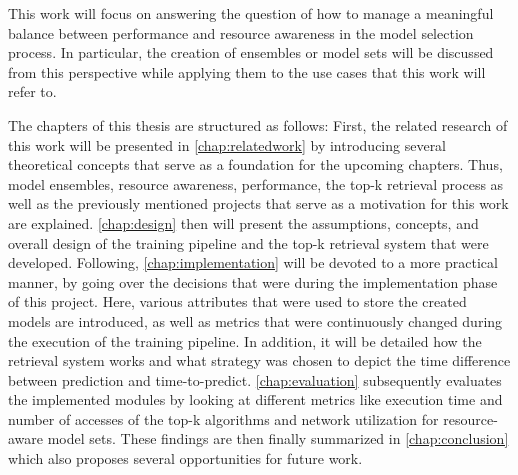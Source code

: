 This work will focus on answering the question of how to manage a meaningful balance between performance and resource awareness in the model selection process. In particular, the creation of ensembles or model sets will be discussed from this perspective while applying them to the use cases that this work will refer to. 

The chapters of this thesis are structured as follows: First, the related research of this work will be presented in \autoref{chap:relatedwork} by introducing several theoretical concepts that serve as a foundation for the upcoming chapters. Thus, model ensembles, resource awareness, performance, the top-k retrieval process as well as the previously mentioned projects that serve as a motivation for this work are explained. \autoref{chap:design} then will present the assumptions, concepts, and overall design of the training pipeline and the top-k retrieval system that were developed. Following, \autoref{chap:implementation} will be devoted to a more practical manner, by going over the decisions that were during the implementation phase of this project. Here, various attributes that were used to store the created models are introduced, as well as metrics that were continuously changed during the execution of the training pipeline. In addition, it will be detailed how the retrieval system works and what strategy was chosen to depict the time difference between prediction and time-to-predict. \autoref{chap:evaluation} subsequently evaluates the implemented modules by looking at different metrics like execution time and number of accesses of the top-k algorithms and network utilization for resource-aware model sets. These findings are then finally summarized in \autoref{chap:conclusion} which also proposes several opportunities for future work.



 